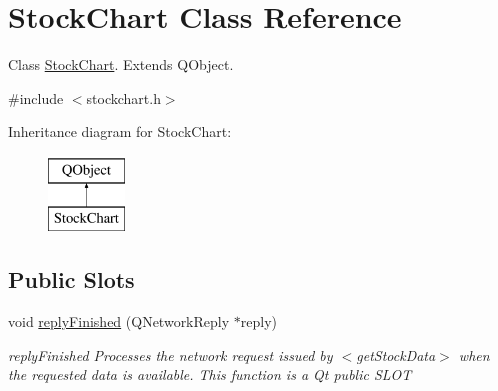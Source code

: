 \hypertarget{class_stock_chart}{}\section{Stock\+Chart Class Reference}
\label{class_stock_chart}


Class \hyperlink{class_stock_chart}{Stock\+Chart}. Extends Q\+Object.  




{\ttfamily \#include $<$stockchart.\+h$>$}

Inheritance diagram for Stock\+Chart\+:\begin{figure}[H]
\begin{center}
\leavevmode
\includegraphics[height=2.000000cm]{class_stock_chart}
\end{center}
\end{figure}
\subsection*{Public Slots}
\begin{DoxyCompactItemize}
\item 
void \hyperlink{class_stock_chart_a2521c5991cca0803f5890e23d90672da}{reply\+Finished} (Q\+Network\+Reply $\ast$reply)
\begin{DoxyCompactList}\small\item\em reply\+Finished Processes the network request issued by $<$get\+Stock\+Data$>$ when the requested data is available. This function is a Qt public S\+L\+OT \end{DoxyCompactList}\end{DoxyCompactItemize}
